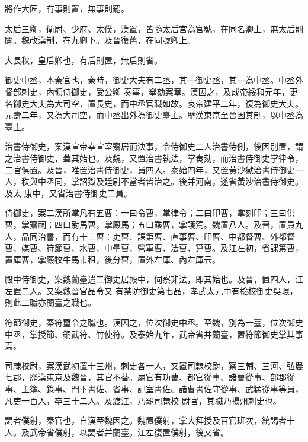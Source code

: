 \begin{pinyinscope}
 將作大匠，有事則置，無事則罷。



 太后三卿，衛尉、少府、太僕，漢置，皆隨太后宮為官號，在同名卿上，無太后則闕。魏改漢制，在九卿下。及晉復舊，在同號卿上。



 大長秋，皇后卿也，有后則置，無后則省。



 御史中丞，本秦官也，秦時，御史大夫有二丞，其一御史丞，其一為中丞。中丞外督部刺史，內領侍御史，受公卿
 奏事，舉劾案章。漢因之，及成帝綏和元年，更名御史大夫為大司空，置長史，而中丞官職如故。哀帝建平二年，復為御史大夫。元壽二年，又為大司空，而中丞出外為御史臺主。歷漢東京至晉因其制，以中丞為臺主。



 治書侍御史，案漢宣帝幸宣室齋居而決事，令侍御史二人治書侍側，後因別置，謂之治書侍御史，蓋其始也。及魏，又置治書執法，掌奏劾，而治書侍御史掌律令，二官俱置。及晉，唯置治書侍御史，員四人。泰始四年，又置黃沙獄治書侍御史一人，秩與中丞同，掌詔獄及廷尉不當者皆治之。後并河南，遂省黃沙治書侍御史。及太
 康中，又省治書侍御史二員。



 侍御史，案二漢所掌凡有五曹：一曰令曹，掌律令；二曰印曹，掌刻印；三曰供曹，掌齋祠；四曰尉馬曹，掌廄馬；五曰乘曹，掌護駕。魏置八人。及晉，置員九人，品同治書，而有十三曹：吏曹、課第曹、直事曹、印曹、中都督曹、外都督曹、媒曹、符節曹、水曹、中壘曹、營軍曹、法曹、算曹。及江左初，省課第曹，置庫曹，掌廄牧牛馬市租，後分曹，置外左庫、內左庫云。



 殿中侍御史，案魏蘭臺遣二御史居殿中，伺察非法，即其始也。及晉，置四人，江左置二人。又案魏晉官品令又
 有禁防御史第七品，孝武太元中有檢校御史吳琨，則此二職亦蘭臺之職也。



 符節御史，秦符璽令之職也。漢因之，位次御史中丞。至魏，別為一臺，位次御史中丞，掌授節、銅武符、竹使符。及泰始九年，武帝省并蘭臺，置符節御史掌其事焉。



 司隸校尉，案漢武初置十三州，刺史各一人，又置司隸校尉，察三輔、三河、弘農七郡，歷漢東京及魏晉，其官不替。屬官有功曹、都官從事、諸曹從事、部郡從事、主簿、錄事、門下書佐、省事、記室書佐、諸曹書佐守從事、武猛從事等員，凡吏一百人，卒三十二人。及渡江，乃罷司隸校
 尉官，其職乃揚州刺史也。



 謁者僕射，秦官也，自漢至魏因之。魏置僕射，掌大拜授及百官班次，統謁者十人。及武帝省僕射，以謁者并蘭臺。江左復置僕射，後又省。




\end{pinyinscope}
